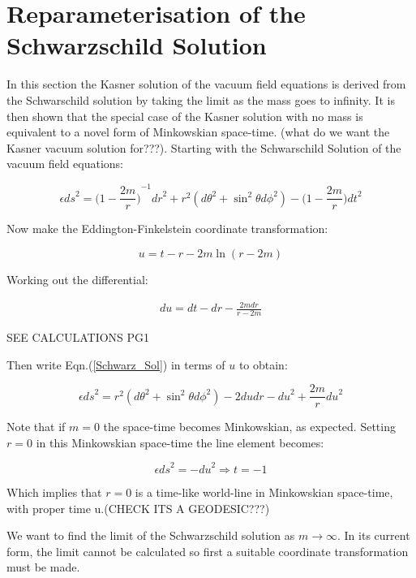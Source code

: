 \section{Reparameterisation of the Schwarzschild Solution}

In this section the Kasner solution of the vacuum field equations is derived from the Schwarschild solution by taking the limit as the mass goes to infinity. It is then shown that the special case of the Kasner solution with no mass is equivalent to a novel form of Minkowskian space-time. (what do we want the Kasner vacuum solution for???). Starting with the Schwarschild Solution of the vacuum field equations:

\begin{equation}\label{Schwarz_Sol} 
\epsilon {ds}^2 = {\big(1 - \frac{2m}{r}\big)}^{-1} {dr}^{2} + r^2 ({d\theta}^2 + {{\sin}^2 \theta}{d \phi}^2) - \big(1 - \frac{2m}{r}\big) {dt}^2
\end{equation}

\noindent Now make the Eddington-Finkelstein coordinate transformation:

\begin{equation}\label{Ed-Fin_trans}
u = t - r - 2m \ln(r - 2m)
\end{equation}

\noindent Working out the differential:

\begin{eqnarray*}
du = dt - dr - \frac{2m dr}{r - 2m}
\end{eqnarray*}

SEE CALCULATIONS PG1

\noindent Then write Eqn.(\ref{Schwarz_Sol}) in terms of $u$ to obtain:

\begin{equation*} 
\epsilon {ds}^{2} = r^2 ({d\theta}^2 + {{\sin}^2 \theta}{d \phi}^2) - 2 du dr - {du}^{2} + \frac{2m}{r} {du}^{2} 
\end{equation*}

Note that if $m = 0$ the space-time becomes Minkowskian, as expected. Setting $r = 0$ in this Minkowskian space-time the line element becomes:

$$ \epsilon {ds}^2 = - {du}^{2} \Rightarrow t = -1$$

\noindent Which implies that $r = 0$ is a time-like world-line in Minkowskian space-time, with proper time u.(CHECK ITS A GEODESIC???)

We want to find the limit of the Schwarzschild solution as $m \rightarrow \infty$. In its current form, the limit cannot be calculated so first a suitable coordinate transformation must be made. 

